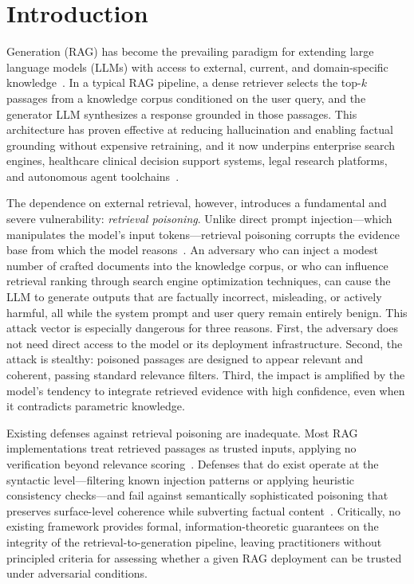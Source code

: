 \documentclass[journal,10pt]{IEEEtran}
\begin{document}
\section{Introduction}
 Generation (RAG) has become the prevailing paradigm for extending large language models (LLMs) with access to external, current, and domain-specific knowledge~\cite{lewis2020rag, gao2024ragsurvey}. In a typical RAG pipeline, a dense retriever selects the top-$k$ passages from a knowledge corpus conditioned on the user query, and the generator LLM synthesizes a response grounded in those passages. This architecture has proven effective at reducing hallucination and enabling factual grounding without expensive retraining, and it now underpins enterprise search engines, healthcare clinical decision support systems, legal research platforms, and autonomous agent toolchains~\cite{shuster2021retrieval, karpukhin2020dense, izacard2022atlas}.

The dependence on external retrieval, however, introduces a fundamental and severe vulnerability: \emph{retrieval poisoning}. Unlike direct prompt injection---which manipulates the model's input tokens---retrieval poisoning corrupts the evidence base from which the model reasons~\cite{zou2024poisonedrag, zhong2025rtbas}. An adversary who can inject a modest number of crafted documents into the knowledge corpus, or who can influence retrieval ranking through search engine optimization techniques, can cause the LLM to generate outputs that are factually incorrect, misleading, or actively harmful, all while the system prompt and user query remain entirely benign. This attack vector is especially dangerous for three reasons. First, the adversary does not need direct access to the model or its deployment infrastructure. Second, the attack is stealthy: poisoned passages are designed to appear relevant and coherent, passing standard relevance filters. Third, the impact is amplified by the model's tendency to integrate retrieved evidence with high confidence, even when it contradicts parametric knowledge.

Existing defenses against retrieval poisoning are inadequate. Most RAG implementations treat retrieved passages as trusted inputs, applying no verification beyond relevance scoring~\cite{gao2024ragsurvey}. Defenses that do exist operate at the syntactic level---filtering known injection patterns or applying heuristic consistency checks---and fail against semantically sophisticated poisoning that preserves surface-level coherence while subverting factual content~\cite{xue2024badrag, chaudhari2024phantom}. Critically, no existing framework provides formal, information-theoretic guarantees on the integrity of the retrieval-to-generation pipeline, leaving practitioners without principled criteria for assessing whether a given RAG deployment can be trusted under adversarial conditions.
\end{document}
